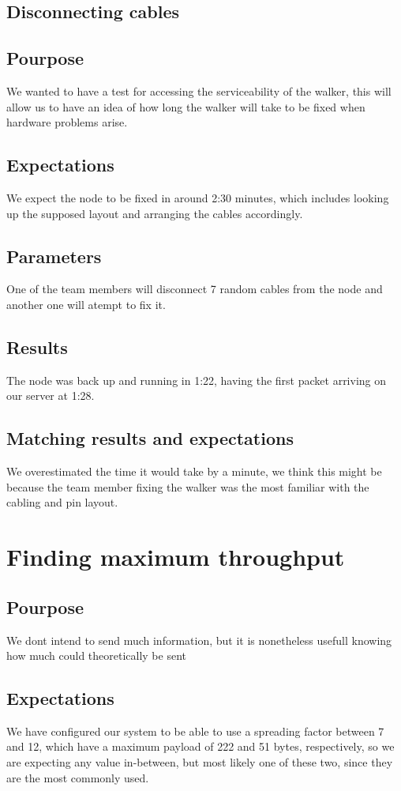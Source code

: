 \subsection{Disconnecting cables}

	\subsection{Pourpose}
		We wanted to have a test for accessing the serviceability of the walker, this will allow us to have an idea of how long the walker will take to be fixed when hardware problems arise.
	\subsection{Expectations}
		We expect the node to be fixed in around 2:30 minutes, which includes looking up the supposed layout and arranging the cables accordingly.
	\subsection{Parameters}
		One of the team members will disconnect 7 random cables from the node and another one will atempt to fix it.
	\subsection{Results}
		The node was back up and running in 1:22, having the first packet arriving on our server at 1:28.
	\subsection{Matching results and expectations}
		We overestimated the time it would take by a minute, we think this might be because the team member fixing the walker was the most familiar with the cabling and pin layout.

\section{Finding maximum throughput}

	\subsection{Pourpose}
		We dont intend to send much information, but it is nonetheless usefull knowing how much could theoretically be sent
	\subsection{Expectations}
		We have configured our system to be able to use a spreading factor between 7 and 12, which have a maximum payload of 222 and 51 bytes, respectively, so we are expecting any value in-between, but most likely one of these two, since they are the most commonly used.
